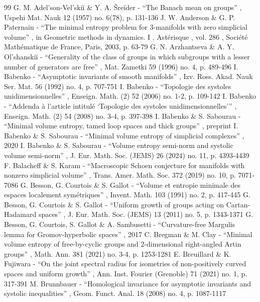 \documentclass[11pt]{article}
\theoremstyle{definition}
\numberwithin{equation}{section}
\begin{document}
\begin{thebibliography}{99}
 G. M. Adel’son-Vel’skiĭ \& Y. A. Šreĭder - “The Banach mean on groups” , Uspehi Mat. Nauk 12 (1957) no. 6(78), p. 131-136
 J. W. Anderson \& G. P. Paternain - “The minimal entropy problem for 3-manifolds with zero simplicial volume” , in Geometric methods in dynamics. I , Astérisque , vol. 286 , Société Mathématique de France, Paris, 2003, p. 63-79
 G. N. Arzhantseva \& A. Y. Ol’shanskiĭ - “Generality of the class of groups in which subgroups with a lesser number of generators are free” , Mat. Zametki 59 (1996) no. 4, p. 489-496
 I. Babenko - “Asymptotic invariants of smooth manifolds” , Izv. Ross. Akad. Nauk Ser. Mat. 56 (1992) no. 4, p. 707-751
 I. Babenko - “Topologie des systoles unidimensionnelles” , Enseign. Math. (2) 52 (2006) no. 1-2, p. 109-142
 I. Babenko - “Addenda à l’article intitulé ‘Topologie des systoles unidimensionnelles’” , Enseign. Math. (2) 54 (2008) no. 3-4, p. 397-398
 I. Babenko \& S. Sabourau - “Minimal volume entropy, tamed loop spaces and thick groups” , preprint
 I. Babenko \& S. Sabourau - “Minimal volume entropy of simplicial complexes” , 2020
 I. Babenko \& S. Sabourau - “Volume entropy semi-norm and systolic volume semi-norm” , J. Eur. Math. Soc. (JEMS) 26 (2024) no. 11, p. 4393-4439
 F. Balacheff \& S. Karam - “Macroscopic Schoen conjecture for manifolds with nonzero simplicial volume” , Trans. Amer. Math. Soc. 372 (2019) no. 10, p. 7071-7086
 G. Besson, G. Courtois \& S. Gallot - “Volume et entropie minimale des espaces localement symétriques” , Invent. Math. 103 (1991) no. 2, p. 417-445
 G. Besson, G. Courtois \& S. Gallot - “Uniform growth of groups acting on Cartan-Hadamard spaces” , J. Eur. Math. Soc. (JEMS) 13 (2011) no. 5, p. 1343-1371
 G. Besson, G. Courtois, S. Gallot \& A. Sambusetti - “Curvature-free Margulis lemma for Gromov-hyperbolic spaces” , 2017
 C. Bregman \& M. Clay - “Minimal volume entropy of free-by-cyclic groups and 2-dimensional right-angled Artin groups” , Math. Ann. 381 (2021) no. 3-4, p. 1253-1281
 E. Breuillard \& K. Fujiwara - “On the joint spectral radius for isometries of non-positively curved spaces and uniform growth” , Ann. Inst. Fourier (Grenoble) 71 (2021) no. 1, p. 317-391
 M. Brunnbauer - “Homological invariance for asymptotic invariants and systolic inequalities” , Geom. Funct. Anal. 18 (2008) no. 4, p. 1087-1117

\end{thebibliography}
\end{document}
